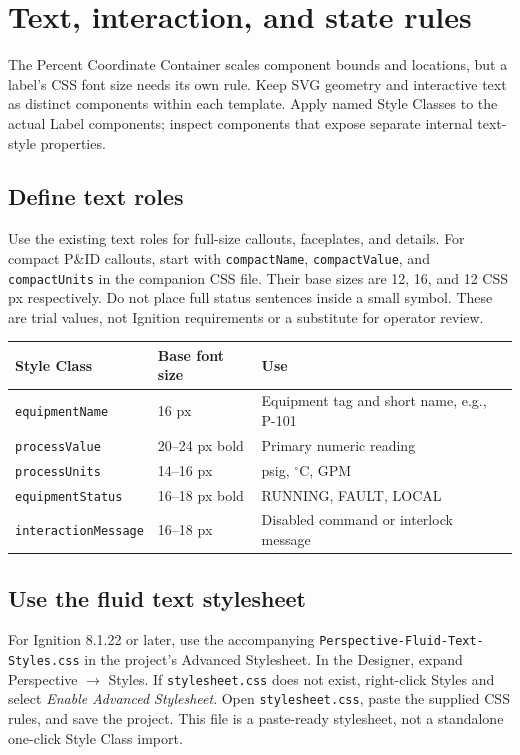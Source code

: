 \section{Text, interaction, and state rules}
The Percent Coordinate Container scales component bounds and locations, but a label's CSS font size needs its own rule. Keep SVG geometry and interactive text as distinct components within each template. Apply named Style Classes to the actual Label components; inspect components that expose separate internal text-style properties.

\subsection{Define text roles}
Use the existing text roles for full-size callouts, faceplates, and details. For compact P\&ID callouts, start with \texttt{compactName}, \texttt{compactValue}, and \texttt{compactUnits} in the companion CSS file. Their base sizes are 12, 16, and 12 CSS px respectively. Do not place full status sentences inside a small symbol. These are trial values, not Ignition requirements or a substitute for operator review.

\begin{center}
\begin{tabular}{@{}p{3.8cm}p{2.8cm}p{5.5cm}@{}}
\toprule
Style Class & Base font size & Use\\ \midrule
\texttt{equipmentName} & 16 px & Equipment tag and short name, e.g., P-101\\
\texttt{processValue} & 20--24 px bold & Primary numeric reading\\
\texttt{processUnits} & 14--16 px & psig, $^\circ$C, GPM\\
\texttt{equipmentStatus} & 16--18 px bold & RUNNING, FAULT, LOCAL\\
\texttt{interactionMessage} & 16--18 px & Disabled command or interlock message\\
\bottomrule
\end{tabular}
\end{center}

\subsection{Use the fluid text stylesheet}
For Ignition 8.1.22 or later, use the accompanying \texttt{Perspective-Fluid-Text-Styles.css} in the project's Advanced Stylesheet. In the Designer, expand Perspective \(\rightarrow\) Styles. If \texttt{stylesheet.css} does not exist, right-click Styles and select \emph{Enable Advanced Stylesheet}. Open \texttt{stylesheet.css}, paste the supplied CSS rules, and save the project. This file is a paste-ready stylesheet, not a standalone one-click Style Class import.

